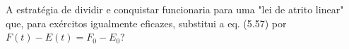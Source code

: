 A estratégia de dividir e conquistar funcionaria para uma "lei de atrito linear" que, para exércitos igualmente eficazes, substitui a eq. (5.57) por $F(t) - E(t) = F_0 - E_0$?
